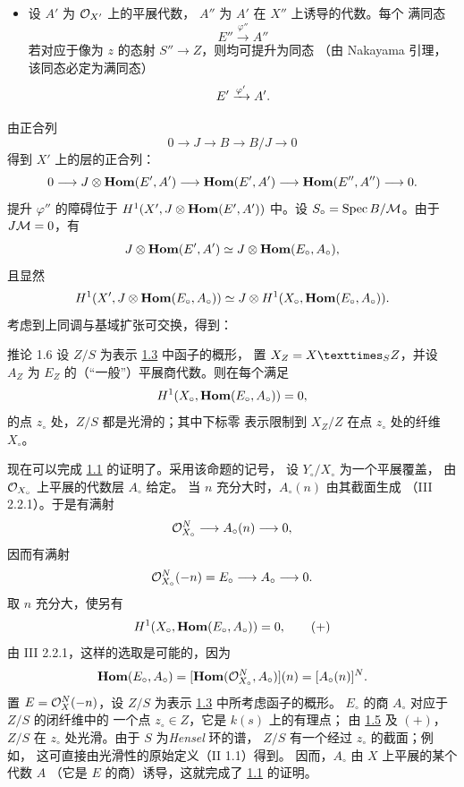 \begin{itemize}
\item[$({\ast}{\ast})$] 设 $A'$ 为 ${\mathcal O}_{X'}$ 上的平展代数，
$A''$ 为 $A'$ 在 $X''$ 上诱导的代数。每个
满同态
$$
E''\xrightarrow{\varphi''}A''
$$
若对应于像为 $z$ 的态射 $S''\rightarrow Z$，则均可提升为同态
（由 Nakayama 引理，该同态必定为满同态）
$$
E'\xrightarrow{\varphi'}A'{}.
$$
\end{itemize}

由正合列
$$
0\longrightarrow J\longrightarrow B\longrightarrow B/J\longrightarrow
0
$$
得到 $X'$ 上的层的正合列：
$$
0\longrightarrow J\otimes\operatorname{\mathbf{Hom}}(E',A')\longrightarrow
\operatorname{\mathbf{Hom}}(E',A')\longrightarrow\operatorname{\mathbf{Hom}}(E'',A'')\longrightarrow
0{}.
$$
提升 $\varphi''$ 的障碍位于
$H^1(X',J\otimes\operatorname{\mathbf{Hom}}(E',A'))$ 中。设
$S_{\circ}=\operatorname{Spec} B/{\mathcal M}$。由于 $J{\mathcal M}=0$，有
$$
J\otimes\operatorname{\mathbf{Hom}}(E',A')\simeq
J\otimes\operatorname{\mathbf{Hom}}(E_{\circ},A_{\circ}){},
$$
且显然
$$
H^1(X',J\otimes\operatorname{\mathbf{Hom}}(E_{\circ},A_{\circ}))\simeq
J\otimes H^1(X_{\circ},\operatorname{\mathbf{Hom}}(E_{\circ},A_{\circ})){}.
$$
考虑到上同调与基域扩张可交换，得到：

\begin{enonce*}{推论 1.6}
设 $Z/S$ 为表示 \hyperref[XIII.lem1.3]{1.3} 中函子的概形，
置 $X_Z=\fprod{X}{Z}{S}$，并设 $A_Z$ 为
$E_Z$ 的（“一般”）平展商代数。则在每个满足
$$
H^1(X_{\circ},\operatorname{\mathbf{Hom}}(E_{\circ},A_{\circ}))=0{},
$$
的点 $z_{\circ}$ 处，$Z/S$ 都是光滑的；其中\pageoriginale 下标零
表示限制到 $X_Z/Z$ 在点 $z_{\circ}$ 处的纤维
$X_{\circ}$。
\end{enonce*}

现在可以完成 \hyperref[XIII.prop1.1]{1.1} 的证明了。采用该命题的记号，
设 $Y_{\circ}/X_{\circ}$ 为一个平展覆盖，
由 ${\mathcal O}_{X_{\circ}}$ 上平展的代数层 $A_{\circ}$ 给定。
当 $n$ 充分大时，$A_{\circ}(n)$ 由其截面生成
（\EGA III 2.2.1）。于是有满射
$$
{\mathcal O}^N_{X_{\circ}}\longrightarrow A_{\circ}(n)\longrightarrow
0{},
$$
因而有满射
$$
{\mathcal O}^N_{X_{\circ}}(-n)=E_{\circ}\longrightarrow
A_{\circ}\longrightarrow 0{}.
$$
取 $n$ 充分大，使另有
\begin{equation*}
H^1(X_{\circ},\operatorname{\mathbf{Hom}}(E_{\circ},A_{\circ}))=0{},\tag{$+$}
\end{equation*}
由 \EGA III 2.2.1，这样的选取是可能的，因为
$$
\operatorname{\mathbf{Hom}}(E_{\circ},A_{\circ})
=[\operatorname{\mathbf{Hom}}({\mathcal O}^N_{X_{\circ}},A_{\circ})](n)
=[A_{\circ}(n)]^N{}.
$$
置 $E={\mathcal O}^N_X(-n)$，设 $Z/S$ 为表示
\hyperref[XIII.lem1.3]{1.3} 中所考虑函子的概形。
$E_{\circ}$ 的商 $A_{\circ}$ 对应于 $Z/S$ 的闭纤维中的
一个点 $z_{\circ}\in Z$，它是 $k(s)$ 上的有理点；
由 \hyperref[XIII.subsec1.5]{1.5} 及 $(+)$，
$Z/S$ 在 $z_{\circ}$ 处光滑。由于 $S$ 为\emph{Hensel} 环的谱，
$Z/S$ 有一个经过 $z_{\circ}$ 的截面；例如，
这可直接由光滑性的原始定义（\SGA II 1.1）得到。
因而，$A_{\circ}$ 由 $X$ 上平展的某个代数 $A$
（它是 $E$ 的商）诱导，这就完成了
\hyperref[XIII.prop1.1]{1.1} 的证明。


